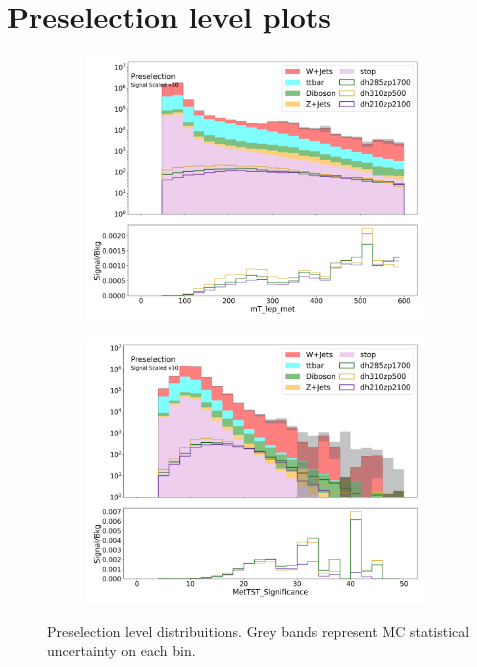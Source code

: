 \label{chapter:appendix}

\section{Preselection level plots}
\label{section:preselection}
\begin{figure}[htbp]
  \centering

     \begin{subfigure}{0.49\textwidth}
     \includegraphics[width = 0.98\textwidth]{Figures/appendix/Preselection/mT_lep_met.png}
     \caption{\mtlepmet}
     \end{subfigure}
     \begin{subfigure}{0.49\textwidth}
     \includegraphics[width = 0.98\textwidth]{Figures/appendix/Preselection/MetTST_Significance.png}
     \caption{\metsig}
     \end{subfigure}
     \caption{Preselection level distribuitions. Grey bands represent MC statistical uncertainty on each bin.}
     \label{fig:Presel1}
  \end{figure}


